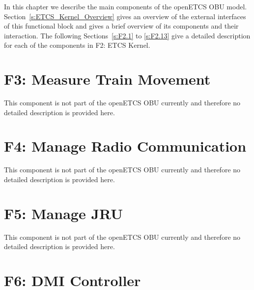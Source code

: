 \documentclass[oneside]{template/openetcs_report}
\begin{document}
In this chapter we describe the main components of the openETCS OBU model. Section~\ref{s:ETCS_Kernel_Overview} gives an overview of the external interfaces of this functional block and gives a brief overview of its components and their interaction. The following Sections~\ref{s:F2.1} to \ref{s:F2.13} give a detailed description for each of the components in F2: ETCS Kernel.






























\chapter{F3: Measure Train Movement}
This component is not part of the openETCS OBU currently and therefore no detailed description is provided here.

\chapter{F4: Manage Radio Communication}
This component is not part of the openETCS OBU currently and therefore no detailed description is provided here.

\chapter{F5: Manage JRU}
This component is not part of the openETCS OBU currently and therefore no detailed description is provided here.

\chapter{F6: DMI Controller}

\end{document}
